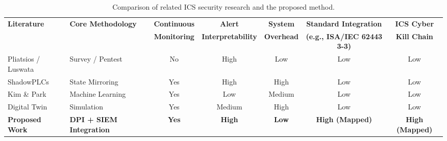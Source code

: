 \begin{table}[htbp]
\centering
\small 
\begin{tabular}{l l c c c c c}
\hline
\textbf{Literature} & \textbf{Core Methodology} & \textbf{Continuous} & \textbf{Alert} & \textbf{System} & \textbf{Standard Integration} & \textbf{ICS Cyber} \\ 
 & & \textbf{Monitoring} & \textbf{Interpretability} & \textbf{Overhead} & \textbf{(e.g., ISA/IEC 62443 3-3)} & \textbf{Kill Chain} \\ \hline
Pliatsios \cite{ref_report25} / Luswata \cite{ref_report27} & Survey / Pentest & No & High & Low & Low & Low \\ 
ShadowPLCs \cite{ref_report28} & State Mirroring & Yes & High & High & Low & Low \\ 
Kim \& Park \cite{ref_report29} & Machine Learning & Yes & Low & Medium & Low & Low \\ 
Digital Twin \cite{ref_report30} & Simulation & Yes & Medium & High & Low & Low \\ \hline
\textbf{Proposed Work} & \textbf{DPI + SIEM Integration} & \textbf{Yes} & \textbf{High} & \textbf{Low} & \textbf{High (Mapped)} & \textbf{High (Mapped)} \\ \hline
\end{tabular}

\caption{Comparison of related ICS security research and the proposed method.}
\label{tab:comparison}
\end{table}

